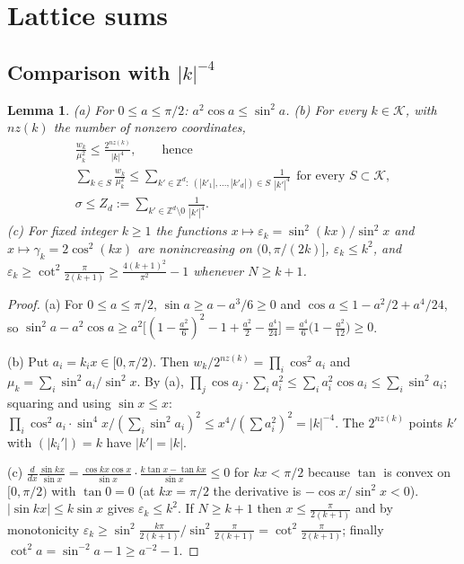 \documentclass[11pt,a4paper]{article}
\newtheorem{lemma}[theorem]{Lemma}
\theoremstyle{definition}
\theoremstyle{remark}
\begin{document}
\setcounter{section}{3}
\section{Lattice sums}

\subsection{Comparison with $|k|^{-4}$}

\begin{lemma}
(a) For $0\le a\le\pi/2$: $a^2\cos a\le\sin^2a$. (b) For every $k\in\mathcal K$, with $nz(k)$ the number of nonzero coordinates,
\begin{gather*}
\frac{w_k}{\mu_k^2}\le\frac{2^{nz(k)}}{|k|^4}, \qquad \text{hence} \\
\sum_{k\in S}\frac{w_k}{\mu_k^2}\le\sum_{k'\in\mathbb Z^d:\ (|k'_1|,\dots,|k'_d|)\in S}\frac1{|k'|^4}\ \ \text{for every }S\subset\mathcal K, \\
\sigma\le Z_d:=\sum_{k'\in\mathbb Z^d\setminus0}\frac{1}{|k'|^4}.
\end{gather*}
(c) For fixed integer $k\ge1$ the functions $x\mapsto\varepsilon_k=\sin^2(kx)/\sin^2x$ and $x\mapsto\gamma_k=2\cos^2(kx)$ are nonincreasing on $(0,\pi/(2k)]$, $\varepsilon_k\le k^2$, and $\varepsilon_k\ge\cot^2\frac{\pi}{2(k+1)}\ge\frac{4(k+1)^2}{\pi^2}-1$ whenever $N\ge k+1$.
\end{lemma}

\begin{proof}
(a) For $0\le a\le\pi/2$, $\sin a\ge a-a^3/6\ge0$ and $\cos a\le1-a^2/2+a^4/24$, so $\sin^2a-a^2\cos a\ge a^2\bigl[(1-\tfrac{a^2}6)^2-1+\tfrac{a^2}2-\tfrac{a^4}{24}\bigr]=\tfrac{a^4}{6}\bigl(1-\tfrac{a^2}{12}\bigr)\ge0$.

(b) Put $a_i=k_ix\in[0,\pi/2)$. Then $w_k/2^{nz(k)}=\prod_i\cos^2a_i$ and $\mu_k=\sum_i\sin^2a_i/\sin^2x$. By (a), $\prod_j\cos a_j\cdot\sum_ia_i^2\le\sum_ia_i^2\cos a_i\le\sum_i\sin^2a_i$; squaring and using $\sin x\le x$: $\prod_i\cos^2a_i\cdot\sin^4x/(\sum_i\sin^2a_i)^2\le x^4/(\sum a_i^2)^2=|k|^{-4}$. The $2^{nz(k)}$ points $k'$ with $(|k_i'|)=k$ have $|k'|=|k|$.

(c) $\frac{d}{dx}\frac{\sin kx}{\sin x}=\frac{\cos kx\cos x}{\sin x}\cdot\frac{k\tan x-\tan kx}{\sin x}\le0$ for $kx<\pi/2$ because $\tan$ is convex on $[0,\pi/2)$ with $\tan0=0$ (at $kx=\pi/2$ the derivative is $-\cos x/\sin^2x<0$). $|\sin kx|\le k\sin x$ gives $\varepsilon_k\le k^2$. If $N\ge k+1$ then $x\le\frac{\pi}{2(k+1)}$ and by monotonicity $\varepsilon_k\ge\sin^2\frac{k\pi}{2(k+1)}/\sin^2\frac{\pi}{2(k+1)}=\cot^2\frac{\pi}{2(k+1)}$; finally $\cot^2a=\sin^{-2}a-1\ge a^{-2}-1$.
\end{proof}
\end{document}
